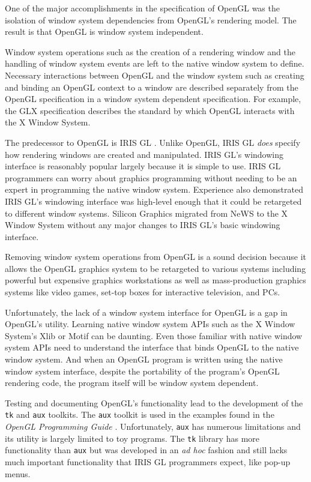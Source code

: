 One of the major accomplishments in the specification of OpenGL \cite{segal92,arb92}
was the
isolation of window system dependencies from OpenGL's rendering model.
The result is that OpenGL is window system independent.

Window system operations such as
the creation of a rendering window and the handling of window system
events are left to the native window system to define.
Necessary interactions between OpenGL and the window system such as creating
and binding an OpenGL context to
a window are described separately from the OpenGL specification in a
window system dependent specification.  For example, the GLX specification
\cite{karlton93}
describes the standard by which OpenGL interacts with the X Window System.

The predecessor to OpenGL is IRIS GL \cite{sgi91a,sgi91b}.
Unlike OpenGL, IRIS GL {\em does}
specify how rendering windows are created and manipulated.  IRIS GL's
windowing interface is reasonably popular largely because it is simple
to use.  IRIS GL programmers can worry about graphics programming without
needing to be an expert in programming the native window system.
Experience also demonstrated IRIS GL's windowing interface was high-level
enough that it could be retargeted to different window systems.  Silicon
Graphics migrated from NeWS to the X Window System without any major
changes to IRIS GL's basic windowing interface.

Removing window system operations from OpenGL is a sound decision
because it allows the OpenGL graphics system to be retargeted to
various systems including powerful but expensive graphics
workstations as well as mass-production graphics systems like video
games, set-top boxes for interactive television, and PCs.

Unfortunately, the lack of a window system interface for OpenGL
is a gap in OpenGL's utility.  Learning native window system APIs
such as the X Window System's Xlib \cite{kilgard94a} or
Motif \cite{kilgard94b} can be daunting.
Even those familiar with native window system APIs need to
understand the interface that binds OpenGL to the native window system.
And when an OpenGL program is written using the native window system
interface, despite the portability of the program's OpenGL rendering
code, the program itself will be window system dependent.

Testing and documenting OpenGL's functionality lead to
the development of the {\tt tk} and {\tt aux} toolkits.  The {\tt aux}
toolkit is used in the examples found in the {\em OpenGL Programming Guide}
\cite{neider93}.
Unfortunately, {\tt aux} has numerous limitations and its utility is
largely limited to toy programs.  The {\tt tk} library has
more functionality than {\tt aux} but was developed in an {\em ad hoc}
fashion and still lacks much important functionality that IRIS GL
programmers expect, like pop-up menus.

